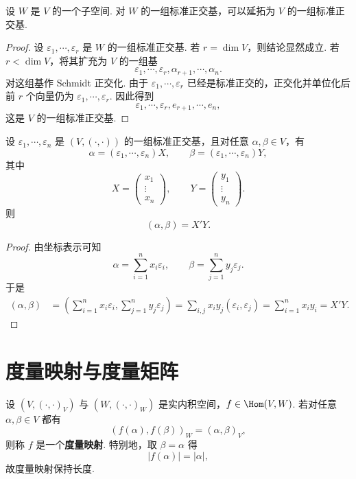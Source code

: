 \begin{corollary}
	设 $W$ 是 $V$ 的一个子空间. 对 $W$ 的一组标准正交基，可以延拓为 $V$ 的一组标准正交基.
\end{corollary}
\begin{proof}
	设 $\varepsilon_1,\cdots,\varepsilon_r$ 是 $W$ 的一组标准正交基. 若 $r=\dim V$，则结论显然成立. 若 $r<\dim V$，将其扩充为 $V$ 的一组基
	\[
	\varepsilon_1,\cdots,\varepsilon_r,\alpha_{r+1},\cdots,\alpha_n.
	\]
	对这组基作 Schmidt 正交化. 由于 $\varepsilon_1,\cdots,\varepsilon_r$ 已经是标准正交的，正交化并单位化后前 $r$ 个向量仍为 $\varepsilon_1,\cdots,\varepsilon_r$. 因此得到
	\[
	\varepsilon_1,\cdots,\varepsilon_r,e_{r+1},\cdots,e_n,
	\]
	这是 $V$ 的一组标准正交基.
\end{proof}

\begin{lemma}
	设 $\varepsilon_1,\cdots,\varepsilon_n$ 是 $(V,(\cdot,\cdot))$ 的一组标准正交基，且对任意 $\alpha,\beta\in V$，有
	\[
	\alpha=(\varepsilon_1,\cdots,\varepsilon_n)X,
	\qquad
	\beta=(\varepsilon_1,\cdots,\varepsilon_n)Y,
	\]
	其中
	\[
	X=\begin{pmatrix}
		x_1\\
		\vdots\\
		x_n
	\end{pmatrix},
	\qquad
	Y=\begin{pmatrix}
		y_1\\
		\vdots\\
		y_n
	\end{pmatrix}.
	\]
	则
	\[
	(\alpha,\beta)=X'Y.
	\]
\end{lemma}
\begin{proof}
	由坐标表示可知
	\[
	\alpha=\sum_{i=1}^{n}x_i\varepsilon_i,
	\qquad
	\beta=\sum_{j=1}^{n}y_j\varepsilon_j.
	\]
	于是
	\[
	\begin{aligned}
		(\alpha,\beta)
		&=\left(\sum_{i=1}^{n}x_i\varepsilon_i,
		\sum_{j=1}^{n}y_j\varepsilon_j\right)=\sum_{i,j}x_i y_j(\varepsilon_i,\varepsilon_j)=\sum_{i=1}^{n}x_i y_i=X'Y.
	\end{aligned}
	\]
\end{proof}

\section{度量映射与度量矩阵}



\begin{definition}\label{p1:concept:c6-l493}
	设 $(V,(\cdot,\cdot)_V)$ 与 $(W,(\cdot,\cdot)_W)$ 是实内积空间，$f\in\Hom(V,W)$. 若对任意 $\alpha,\beta\in V$ 都有
	\[
	(f(\alpha),f(\beta))_W=(\alpha,\beta)_V,
	\]
	则称 $f$ 是一个\textbf{度量映射}. 特别地，取 $\beta=\alpha$ 得
	\[
	|f(\alpha)|=|\alpha|,
	\]
	故度量映射保持长度.
\end{definition}

